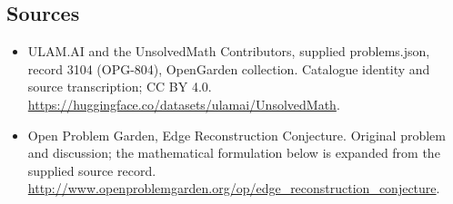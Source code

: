 \documentclass[11pt,a4paper]{article}
\begin{document}
\subsection{Sources}
\begin{itemize}
\item[S1] ULAM.AI and the UnsolvedMath Contributors, supplied problems.json, record 3104 (OPG-804), OpenGarden collection. Catalogue identity and source transcription; CC BY 4.0.
\url{https://huggingface.co/datasets/ulamai/UnsolvedMath}.
\item[S2] Open Problem Garden, Edge Reconstruction Conjecture. Original problem and discussion; the mathematical formulation below is expanded from the supplied source record.
\url{http://www.openproblemgarden.org/op/edge_reconstruction_conjecture}.

\end{itemize}
\end{document}
